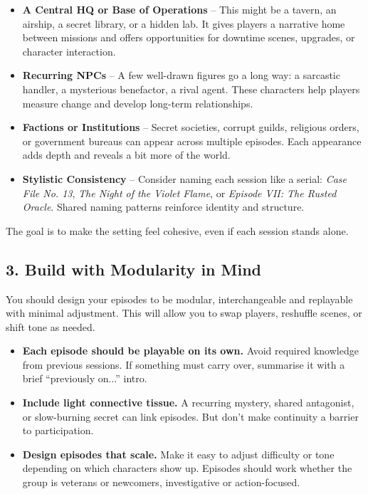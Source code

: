 \begin{itemize}
    \item \textbf{A Central HQ or Base of Operations} – This might be a tavern, an airship, a secret library, or a hidden lab. It gives players a narrative home between missions and offers opportunities for downtime scenes, upgrades, or character interaction.

    \item \textbf{Recurring NPCs} – A few well-drawn figures go a long way: a sarcastic handler, a mysterious benefactor, a rival agent. These characters help players measure change and develop long-term relationships.

    \item \textbf{Factions or Institutions} – Secret societies, corrupt guilds, religious orders, or government bureaus can appear across multiple episodes. Each appearance adds depth and reveals a bit more of the world.

    \item \textbf{Stylistic Consistency} – Consider naming each session like a serial: \emph{Case File No. 13}, \emph{The Night of the Violet Flame}, or \emph{Episode VII: The Rusted Oracle}. Shared naming patterns reinforce identity and structure.
\end{itemize}

The goal is to make the setting feel cohesive, even if each session stands alone.

\subsection*{3. Build with Modularity in Mind}

You should design your episodes to be modular, interchangeable and replayable with minimal adjustment. This will allow you to swap players, reshuffle scenes, or shift tone as needed.

\begin{itemize}\raggedright
    \item \textbf{Each episode should be playable on its own.} Avoid required knowledge from previous sessions. If something must carry over, summarise it with a brief “previously on...” intro.

    \item \textbf{Include light connective tissue.} A recurring mystery, shared antagonist, or slow-burning secret can link episodes. But don’t make continuity a barrier to participation.

    \item \textbf{Design episodes that scale.} Make it easy to adjust difficulty or tone depending on which characters show up. Episodes should work whether the group is veterans or newcomers, investigative or action-focused.
\end{itemize}

